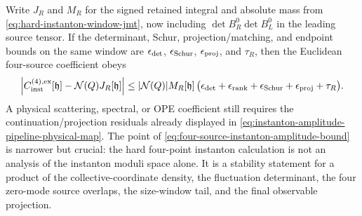 \begin{controlledapproximation}
Write \(J_R\) and \(M_R\) for the signed retained integral and absolute mass
from \eqref{eq:hard-instanton-window-jmt}, now including
\(\det B_R^0\det B_L^0\) in the leading source tensor.  If the determinant,
Schur, projection/matching, and endpoint bounds on the same window are
\(\epsilon_{\rm det}\), \(\epsilon_{\rm Schur}\),
\(\epsilon_{\rm proj}\), and \(\tau_R\), then the Euclidean four-source
coefficient obeys
\begin{equation}
  \left|
    C_{\rm inst}^{(4),{\rm ex}}[\mathfrak h]
    -\mathcal N(Q)J_R[\mathfrak h]
  \right|
  \le
  |\mathcal N(Q)|M_R[\mathfrak h]\,
  \bigl(
    \epsilon_{\rm det}
    +\epsilon_{\rm rank}
    +\epsilon_{\rm Schur}
    +\epsilon_{\rm proj}
    +\tau_R
  \bigr).
  \label{eq:four-source-instanton-amplitude-bound}
\end{equation}
A physical scattering, spectral, or OPE coefficient still requires the
continuation/projection residuals already displayed in
\eqref{eq:instanton-amplitude-pipeline-physical-map}.  The point of
\eqref{eq:four-source-instanton-amplitude-bound} is narrower but crucial:
the hard four-point instanton calculation is not an analysis of the instanton
moduli space alone.  It is a stability statement for a product of the
collective-coordinate density, the fluctuation determinant, the four
zero-mode source overlaps, the size-window tail, and the final observable
projection.
\end{controlledapproximation}

